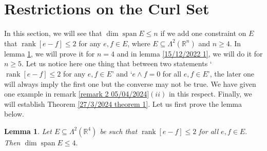 \documentclass[11pt, a4paper, reqno]{amsart}
\numberwithin{equation}{section}
\newcommand{\spann}{\operatorname{span}}
\newcommand{\rank}{\operatorname{rank}}
\newtheorem{lemma}[theorem]{Lemma}
\begin{document}
\section{Restrictions on the Curl Set}
In this section, we will see that $\dim \spann E\leq n$  if we add one constraint on $E$ that $\rank [e-f]\leq 2 $ for any $e,f\in E$, where $E\subseteq \Lambda^2(\mathbb R^n)$ and $n\geq 4$.  In lemma \ref{theorem 1}, we will prove it for $n=4$ and in lemma \ref{15/12/2022 1}, we will do it for $n\geq 5.$ Let us notice here one thing that between two statements `$\rank[e-f]\leq 2 $ for any $e,f\in E$' and `$e\wedge f=0 $ for all $e,f\in E$', the later one will always imply the first one but the converse may not be true. We have given one example in remark \ref{remark 2 05/04/2024}$(ii)$ in this respect. Finally, we will establish Theorem \ref{27/3/2024 theorem 1}. Let us first prove the lemma below. 
\begin{lemma} \label{theorem 1}
Let $E\subseteq \Lambda^2(\mathbb R^4)$ be such that  $\rank [e-f]\leq 2$ for all $e,f\in E.$ Then $\dim \spann E\leq 4.$
\end{lemma}
\end{document}
